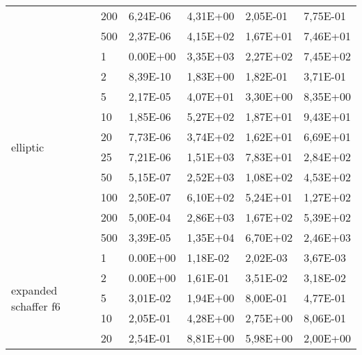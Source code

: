 \begin{longtable}[c]{|m{3.5cm}|l|l|l|l|l|}
                                        & 200       & 6,24E-06   & 4,31E+00   & 2,05E-01   & 7,75E-01  \\ \cline{2-6} 
                                        & 500       & 2,37E-06   & 4,15E+02   & 1,67E+01   & 7,46E+01  \\ \hline
\multirow{10}{*}{elliptic}              & 1         & 0.00E+00   & 3,35E+03   & 2,27E+02   & 7,45E+02  \\ \cline{2-6} 
                                        & 2         & 8,39E-10   & 1,83E+00   & 1,82E-01   & 3,71E-01  \\ \cline{2-6} 
                                        & 5         & 2,17E-05   & 4,07E+01   & 3,30E+00   & 8,35E+00  \\ \cline{2-6} 
                                        & 10        & 1,85E-06   & 5,27E+02   & 1,87E+01   & 9,43E+01  \\ \cline{2-6} 
                                        & 20        & 7,73E-06   & 3,74E+02   & 1,62E+01   & 6,69E+01  \\ \cline{2-6} 
                                        & 25        & 7,21E-06   & 1,51E+03   & 7,83E+01   & 2,84E+02  \\ \cline{2-6} 
                                        & 50        & 5,15E-07   & 2,52E+03   & 1,08E+02   & 4,53E+02  \\ \cline{2-6} 
                                        & 100       & 2,50E-07   & 6,10E+02   & 5,24E+01   & 1,27E+02  \\ \cline{2-6} 
                                        & 200       & 5,00E-04   & 2,86E+03   & 1,67E+02   & 5,39E+02  \\ \cline{2-6} 
                                        & 500       & 3,39E-05   & 1,35E+04   & 6,70E+02   & 2,46E+03  \\ \hline
\multirow{10}{*}{expanded schaffer f6}  & 1         & 0.00E+00   & 1,18E-02   & 2,02E-03   & 3,67E-03  \\ \cline{2-6} 
                                        & 2         & 0.00E+00   & 1,61E-01   & 3,51E-02   & 3,18E-02  \\ \cline{2-6} 
                                        & 5         & 3,01E-02   & 1,94E+00   & 8,00E-01   & 4,77E-01  \\ \cline{2-6} 
                                        & 10        & 2,05E-01   & 4,28E+00   & 2,75E+00   & 8,06E-01  \\ \cline{2-6} 
                                        & 20        & 2,54E-01   & 8,81E+00   & 5,98E+00   & 2,00E+00  \\ \cline{2-6} 

\end{longtable}
